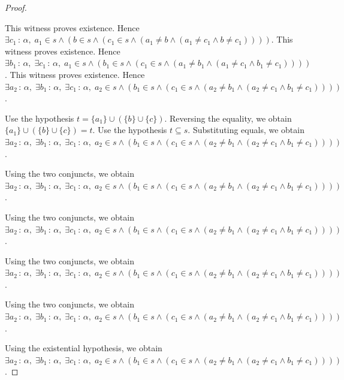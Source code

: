 \documentclass{article}
\theoremstyle{paperresult}
\newenvironment{proofstep}{\par\smallskip\ifdim\leftskip<3em\relax\advance\leftskip by 1em\relax\fi\noindent\ignorespaces}{\par\smallskip}
\begin{document}
\begin{proof}
\begin{proofstep}
\begin{proofstep}
\begin{proofstep}
\begin{proofstep}
\begin{proofstep}
\begin{proofstep}
\begin{proofstep}
\begin{proofstep}
\begin{proofstep}
\begin{proofstep}
This witness proves existence. Hence \(\exists c_{1}\, :\, \alpha,\; a_{1} \in s \land (b \in s \land (c_{1} \in s \land (a_{1} \ne b \land (a_{1} \ne c_{1} \land b \ne c_{1}))))\).
This witness proves existence. Hence \(\exists b_{1}\, :\, \alpha,\; \exists c_{1}\, :\, \alpha,\; a_{1} \in s \land (b_{1} \in s \land (c_{1} \in s \land (a_{1} \ne b_{1} \land (a_{1} \ne c_{1} \land b_{1} \ne c_{1}))))\).
This witness proves existence. Hence \(\exists a_{2}\, :\, \alpha,\; \exists b_{1}\, :\, \alpha,\; \exists c_{1}\, :\, \alpha,\; a_{2} \in s \land (b_{1} \in s \land (c_{1} \in s \land (a_{2} \ne b_{1} \land (a_{2} \ne c_{1} \land b_{1} \ne c_{1}))))\).
\end{proofstep}
Use the hypothesis \(t = \{a_{1}\} \cup \left(\{b\} \cup \{c\}\right)\).
Reversing the equality, we obtain \(\{a_{1}\} \cup \left(\{b\} \cup \{c\}\right) = t\).
Use the hypothesis \(t \subseteq s\).
Substituting equals, we obtain \(\exists a_{2}\, :\, \alpha,\; \exists b_{1}\, :\, \alpha,\; \exists c_{1}\, :\, \alpha,\; a_{2} \in s \land (b_{1} \in s \land (c_{1} \in s \land (a_{2} \ne b_{1} \land (a_{2} \ne c_{1} \land b_{1} \ne c_{1}))))\).
\end{proofstep}
Using the two conjuncts, we obtain \(\exists a_{2}\, :\, \alpha,\; \exists b_{1}\, :\, \alpha,\; \exists c_{1}\, :\, \alpha,\; a_{2} \in s \land (b_{1} \in s \land (c_{1} \in s \land (a_{2} \ne b_{1} \land (a_{2} \ne c_{1} \land b_{1} \ne c_{1}))))\).
\end{proofstep}
Using the two conjuncts, we obtain \(\exists a_{2}\, :\, \alpha,\; \exists b_{1}\, :\, \alpha,\; \exists c_{1}\, :\, \alpha,\; a_{2} \in s \land (b_{1} \in s \land (c_{1} \in s \land (a_{2} \ne b_{1} \land (a_{2} \ne c_{1} \land b_{1} \ne c_{1}))))\).
\end{proofstep}
Using the two conjuncts, we obtain \(\exists a_{2}\, :\, \alpha,\; \exists b_{1}\, :\, \alpha,\; \exists c_{1}\, :\, \alpha,\; a_{2} \in s \land (b_{1} \in s \land (c_{1} \in s \land (a_{2} \ne b_{1} \land (a_{2} \ne c_{1} \land b_{1} \ne c_{1}))))\).
\end{proofstep}
Using the two conjuncts, we obtain \(\exists a_{2}\, :\, \alpha,\; \exists b_{1}\, :\, \alpha,\; \exists c_{1}\, :\, \alpha,\; a_{2} \in s \land (b_{1} \in s \land (c_{1} \in s \land (a_{2} \ne b_{1} \land (a_{2} \ne c_{1} \land b_{1} \ne c_{1}))))\).
\end{proofstep}
Using the existential hypothesis, we obtain \(\exists a_{2}\, :\, \alpha,\; \exists b_{1}\, :\, \alpha,\; \exists c_{1}\, :\, \alpha,\; a_{2} \in s \land (b_{1} \in s \land (c_{1} \in s \land (a_{2} \ne b_{1} \land (a_{2} \ne c_{1} \land b_{1} \ne c_{1}))))\).

\end{proofstep}
\end{proofstep}
\end{proofstep}
\end{proofstep}
\end{proof}
\end{document}
